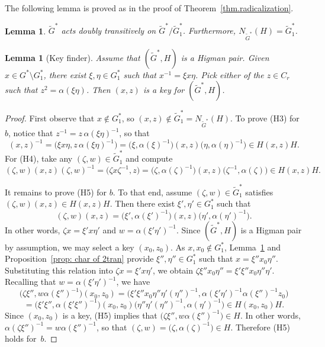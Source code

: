 \documentclass[11pt]{article}
\newtheorem{lemma}[theo]{Lemma}
\theoremstyle{definition}
\numberwithin{equation}{section}
\begin{document}
The following lemma is proved as in the proof of Theorem~\ref{thm.radicalization}.

\begin{lemma}
\label{lem.normalizer}
$\widetilde{G}^*$ acts doubly transitively on $\widetilde{G}^*/\widetilde{G}_1^*$. Furthermore, $N_{\widetilde{G}^*}(H) = \widetilde{G}_1^*$.
\end{lemma}


\begin{lemma}[Key finder]
\label{lem.key finder}
Assume that $(\widetilde{G}^*, H)$ is a Higman pair.
Given $x \in G^* \setminus G^*_1$, there exist $\xi, \eta \in G_1^*$ such that $x^{-1} = \xi x \eta$.
Pick either of the $z \in C_r$ such that $z^2 = \alpha(\xi\eta)$.
Then $(x,z)$ is a key for $(\widetilde{G}^*,H)$.
\end{lemma}

\begin{proof}
First observe that $x \notin G_1^*$, so $(x,z) \notin \widetilde{G}_1^* = N_{\widetilde{G}^*}(H)$.
To prove (H3) for $b$, notice that $z^{-1} = z\,\alpha(\xi\eta)^{-1}$, so that
\begin{equation}
\label{eq:H3}
(x,z)^{-1}
= \bigl(\xi x \eta, z\, \alpha(\xi \eta)^{-1}\bigr)
=\bigl( \xi, \alpha(\xi)^{-1} \bigr) (x,z) \bigl( \eta, \alpha(\eta)^{-1} \bigr)
\in H(x,z)H.
\end{equation}
For (H4), take any $(\zeta, w) \in \widetilde{G}_1^*$ and compute
\begin{equation}
\label{eq:H4}
(\zeta,w)(x,z)(\zeta,w)^{-1}
= \bigl(\zeta x \zeta^{-1}, z\bigr)
=\bigl( \zeta, \alpha(\zeta)^{-1} \bigr)(x,z)\bigl(\zeta^{-1},\alpha(\zeta) \bigr)
\in H(x,z)H.
\end{equation}

It remains to prove (H5) for $b$. 
To that end, assume $(\zeta, w) \in \widetilde{G}_1^*$ satisfies $(\zeta,w)(x,z) \in H(x,z)H$.
Then there exist $\xi',\eta' \in G_1^*$ such that 
\[ (\zeta,w)(x,z) = \bigl( \xi', \alpha(\xi')^{-1} \bigr) (x,z) \bigl( \eta', \alpha(\eta')^{-1} \bigr). \]
In other words, $\zeta x = \xi' x \eta'$ and $w = \alpha(\xi' \eta')^{-1}$.
Since $(\widetilde{G}^*,H)$ is a Higman pair by assumption, we may select a key $(x_0,z_0)$.
As $x,x_0 \notin G_1^*$, Lemma~\ref{lem.normalizer} and Proposition~\ref{prop: char of 2tran} provide $\xi'', \eta'' \in G_1^*$ such that $x = \xi'' x_0 \eta''$.
Substituting this relation into $\zeta x = \xi' x \eta'$, we obtain $\zeta \xi'' x_0 \eta'' = \xi' \xi'' x_0 \eta'' \eta'$.
Recalling that $w = \alpha(\xi' \eta')^{-1}$, we have
\[
\bigl(\zeta \xi'', w \alpha(\xi'')^{-1}\bigr)(x_0,z_0)
= \bigl(\xi' \xi'' x_0 \eta'' \eta' (\eta'')^{-1}, \alpha(\xi' \eta')^{-1} \alpha(\xi'')^{-1} z_0 \bigr)
\]
\[
= \bigl( \xi' \xi'', \alpha(\xi' \xi'')^{-1} \bigr)
(x_0,z_0)
\bigl(\eta'' \eta' (\eta'')^{-1}, \alpha(\eta')^{-1}\bigr)
\in H(x_0,z_0)H.
\]
Since $(x_0,z_0)$ is a key, (H5) implies that $\bigl(\zeta \xi'', w \alpha(\xi'')^{-1}\bigr) \in H$.
In other words, $\alpha(\zeta \xi'')^{-1} = w \alpha(\xi'')^{-1}$, so that $(\zeta,w) = \bigl( \zeta, \alpha(\zeta)^{-1} \bigr) \in H$.
Therefore (H5) holds for~$b$.
\end{proof}
\end{document}
